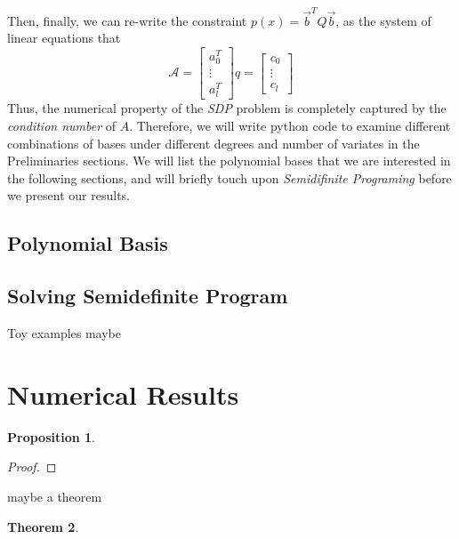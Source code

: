 \documentclass[12pt]{amsart}
\numberwithin{equation}{section}
\newtheorem{thm}{Theorem}
\newtheorem{prop}[thm]{Proposition}
\theoremstyle{definition}
\numberwithin{thm}{section}
\begin{document}
\smallskip
Then, finally, we can re-write the constraint $p(x) = \vec{b}^T Q \vec{b}$, as the system of linear equations that 
\begin{equation}
     \mathcal{A} = \begin{bmatrix}
          a_0^T \\
          \vdots \\
          a_l^T
     \end{bmatrix} q = \begin{bmatrix}
          c_0 \\
          \vdots \\
          c_l
     \end{bmatrix}
\end{equation}
Thus, the numerical property of the \emph{SDP} problem is completely captured by the \emph{condition number} of $A$. 
Therefore, we will write python code to examine different combinations of bases under different degrees and number of variates in the Preliminaries sections. 
We will list the polynomial bases that we are interested in the following sections, and will briefly touch upon \emph{Semidifinite Programing} before we present our results.

\subsection{Polynomial Basis}
\label{Sec:polynomial Basis}

\subsection{Solving Semidefinite Program}
\label{Sec:Solving Semidefinite Program}




Toy examples maybe

\newpage
\section{Numerical Results}


\begin{prop}

\end{prop}

\begin{proof}

\end{proof}

maybe a theorem


\begin{thm}

\end{thm}
\end{document}
